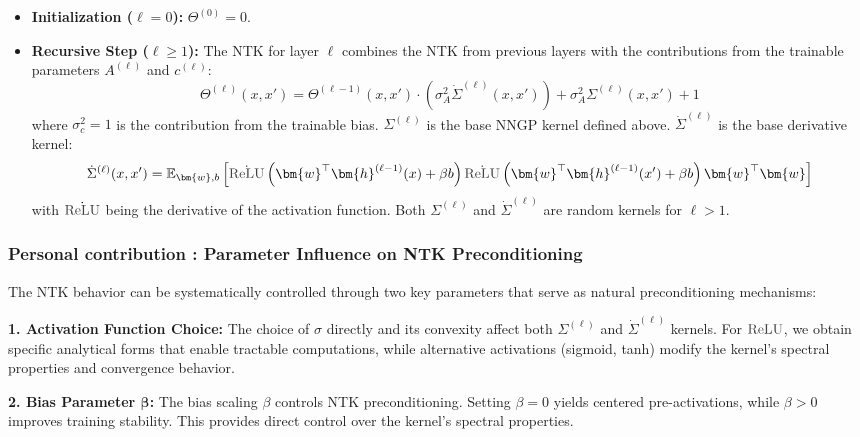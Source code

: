 \documentclass[a4paper]{article}
\newcommand{\ReLU}{\textcolor{relucolor}{\text{ReLU}}}
\DeclareRobustCommand{\ReLU}{\mathrel{\text{%
    \begin{tikzpicture}[baseline=(current bounding box.south)]
        \draw[thick] (0,0) -- (0.25,0) -- (0.4,0.25);
    \end{tikzpicture}}}\!\!}
\theoremstyle{plain}
\theoremstyle{definition}
\theoremstyle{remark}
\begin{document}
\begin{tcolorbox}[colback=blue!10,colframe=blue!80!black,title={\textbf{NTK Recursion Formula}},enhanced,drop shadow,boxrule=2pt]
\begin{itemize}
    \item \textbf{Initialization (\(\ell=0\)):} $\Theta^{(0)} = 0$.
    
    \item \textbf{Recursive Step (\(\ell \ge 1\)):} The NTK for layer $\ell$ combines the NTK from previous layers with the contributions from the trainable parameters $A^{(\ell)}$ and $c^{(\ell)}$:
    \begin{equation}
        \boxed{
        \Theta^{(\ell)}(x, x') = \Theta^{(\ell-1)}(x, x') \cdot \left(\sigma_A^2\dot{\Sigma}^{(\ell)}(x, x')\right) + \sigma_A^2 \Sigma^{(\ell)}(x, x') + 1
        }
    \end{equation}
    where $\sigma_c^2=1$ is the contribution from the trainable bias. $\Sigma^{(\ell)}$ is the base NNGP kernel defined above. $\dot{\Sigma}^{(\ell)}$ is the base derivative kernel:
    \begin{equation}
        \dot{\Sigma}^{(\ell)}(x, x') = \mathbb{E}_{\bm{w}, b} \left[ \dot{\ReLU}\left(\bm{w}^\top \bm{h}^{(\ell-1)}(x) + \beta b\right) \dot{\ReLU}\left(\bm{w}^\top \bm{h}^{(\ell-1)}(x') + \beta b\right) \bm{w}^\top\bm{w} \right]
    \end{equation}
    with $\dot{\ReLU}$ being the derivative of the activation function. Both $\Sigma^{(\ell)}$ and $\dot{\Sigma}^{(\ell)}$ are random kernels for $\ell > 1$.
\end{itemize}
\end{tcolorbox}


\subsubsection{Personal contribution : Parameter Influence on NTK Preconditioning}

\begin{tcolorbox}[colback=green!5,colframe=green!80!black,title={\textbf{Remark: Activation and Bias Influence on NTK}},enhanced,drop shadow,boxrule=2pt]
The NTK behavior can be systematically controlled through two key parameters that serve as natural preconditioning mechanisms:

\textbf{1. Activation Function Choice:} The choice of $\sigma$ directly and its convexity affect both $\Sigma^{(\ell)}$ and $\dot{\Sigma}^{(\ell)}$ kernels. For $\ReLU$, we obtain specific analytical forms that enable tractable computations, while alternative activations (sigmoid, tanh) modify the kernel's spectral properties and convergence behavior.

\textbf{2. Bias Parameter $\boldsymbol{\beta}$:} The bias scaling $\beta$ controls NTK preconditioning. Setting $\beta = 0$ yields centered pre-activations, while $\beta > 0$ improves training stability. This provides direct control over the kernel's spectral properties.
\end{tcolorbox}
\end{document}
